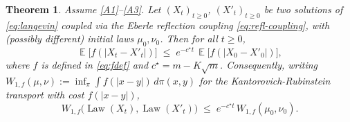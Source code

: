 \documentclass[11pt]{article}
\newtheorem{theorem}{Theorem}
\theoremstyle{definition}
\DeclareMathOperator{\E}{\mathbb{E}}
\DeclareMathOperator{\Law}{Law}
\newcommand{\abs}[1]{\left\lvert #1 \right\rvert}
\begin{document}
\begin{theorem}\label{thm:main}
Assume \ref{A1}--\ref{A3}. Let $(X_t)_{t\ge 0}$, $(X'_t)_{t\ge 0}$ be two solutions of \eqref{eq:langevin} coupled via the Eberle reflection coupling \eqref{eq:refl-coupling}, with (possibly different) initial laws $\mu_0,\nu_0$. Then for all $t \ge 0$,
\begin{equation}\label{eq:main}
\E\bigl[f(\abs{X_t - X'_t})\bigr] \;\le\; e^{-c^\star t}\, \E\bigl[f(\abs{X_0 - X'_0})\bigr],
\end{equation}
where $f$ is defined in \eqref{eq:fdef} and $c^\star = m - K\sqrt m$. Consequently, writing $W_{1,f}(\mu,\nu) := \inf_{\pi}\int f(\abs{x-y})\,d\pi(x,y)$ for the Kantorovich-Rubinstein transport with cost $f(\abs{x-y})$,
\begin{equation}\label{eq:W1f-contraction}
W_{1,f}\bigl(\Law(X_t),\Law(X'_t)\bigr) \;\le\; e^{-c^\star t}\, W_{1,f}(\mu_0,\nu_0).
\end{equation}
\end{theorem}
\end{document}
